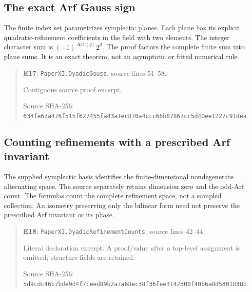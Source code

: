 \documentclass[10pt,oneside]{book}
\begin{document}

\subsection{The exact Arf Gauss sign}
\label{guide:E17}
The finite index set parametrizes symplectic planes. Each plane has its explicit quadratic-refinement coefficients in the field with two elements.
The integer character sum is \( (-1)^{\operatorname{Arf}(q)}2^d\). The proof factors the complete finite sum into plane sums. It is an exact theorem, not an asymptotic or fitted numerical rule.

\begin{quote}\footnotesize\textbf{E17}: \nolinkurl{PaperXI.DyadicGauss}, source lines 51--58.\par Contiguous source proof excerpt.\par Source SHA-256: {\scriptsize\texttt{634fe67a476f515f627455fa43a1ec870a4ccc66b87867cc5d40ee1227c91dea}}.\end{quote}


\subsection{Counting refinements with a prescribed Arf invariant}
\label{guide:E18}
The supplied symplectic basis identifies the finite-dimensional nondegenerate alternating space. The source separately retains dimension zero and the odd-Arf count.
The formulas count the complete refinement space, not a sampled collection. An isometry preserving only the bilinear form need not preserve the prescribed Arf invariant or its phase.

\begin{quote}\footnotesize\textbf{E18}: \nolinkurl{PaperXI.DyadicRefinementCounts}, source lines 42--44.\par Literal declaration excerpt. A proof/value after a top-level assignment is omitted; structure fields are retained.\par Source SHA-256: {\scriptsize\texttt{5d9cdc46b7bde9d4f7ceed89b2a7a68ec38f36fee3142300f40b6a8d5301838b}}.\end{quote}

\end{document}
